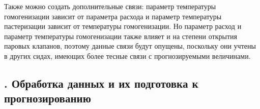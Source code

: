 {  \par \redline Также можно создать дополнительные связи: параметр температуры гомогенизации зависит от параметра расхода и параметр температуры пастеризации зависит от температуры гомогенизации. Но параметр расход и параметр температуры гомогенизации также влияет и на степени открытия паровых клапанов, поэтому данные связи будут опущены, поскольку они учтены в других сидах, имеющих более тесные связи с прогнозируемыми величинами.    

  \par
}

\titlespace

\subsection*{
  \gostTitleFont
  \redline
  \thechaptercntr .\thesubchaptercntr \spc
  Обработка данных и их подготовка к прогнозированию
} \addtocounter{subchaptercntr}{1}

\titlespace

